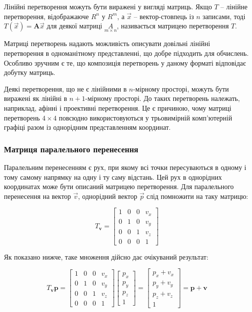 Лінійні перетворення можуть бути виражені у вигляді матриць. Якщо $T$ -- лінійне перетворення, відображаюче $R^n$ у $R^m$, а $\vec x$ -- вектор-стовпець із $n$ записами, тоді
$T( \vec x ) = \mathbf{A} \vec x$
для деякої матриці $\underset{m \times n}{A}$, називається матрицею перетворення $T$.

Матриці перетворень надають можливість описувати довільні лінійні перетворення в одноманітному представленні, що добре підходить для обчислень. Особливо зручним є те, що композиція перетворень у даному форматі відповідає добутку матриць.

Деякі перетворення, що не є лінійними в $n$-мірному просторі, можуть бути виражені як лінійні в $n+1$-мірному просторі. До таких перетворень належать, наприклад, афінні і проективні перетворення. Це є причиною, чому матриці перетворень $4 \times 4$ повсюдно використовуються у трьовимірній комп'ютерній графіці разом із однорідним представленням координат.

\subsubsection{Матриця паралельного перенесення}

Паралельним перенесенням є рух, при якому всі точки пересуваються в одному і тому самому напрямку на одну і ту саму відстань. Цей рух в однорідних координатах може бути описаний матрицею перетворення. Для паралельного перенесення на вектор $\vec v$, однорідний вектор $\vec p$ слід помножити на таку матрицю:

\begin{equation}
  T_{\mathbf{v}} =
  \begin{bmatrix}
    1 & 0 & 0 & v_x \\
    0 & 1 & 0 & v_y \\
    0 & 0 & 1 & v_z \\
    0 & 0 & 0 & 1
  \end{bmatrix}
\end{equation}

Як показано нижче, таке множення дійсно дає очікуваний результат:

\begin{equation}
  T_{\mathbf{v}} \mathbf{p} =
  \begin{bmatrix}
    1 & 0 & 0 & v_x \\
    0 & 1 & 0 & v_y\\
    0 & 0 & 1 & v_z\\
    0 & 0 & 0 & 1
  \end{bmatrix}
  \begin{bmatrix}
    p_x \\ p_y \\ p_z \\ 1
  \end{bmatrix}
  =
  \begin{bmatrix}
    p_x + v_x \\ p_y + v_y \\ p_z + v_z \\ 1
  \end{bmatrix}
  = \mathbf{p} + \mathbf{v}
\end{equation}

